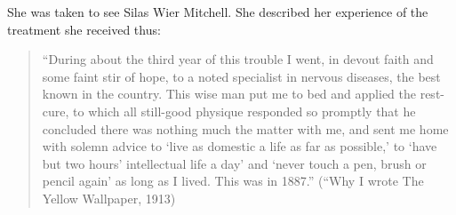 \begin{refsection}
She was taken to see Silas Wier Mitchell. She described her experience of the treatment she received thus:

\begin{quote}

“During about the third year of this trouble I went, in devout faith and some faint stir of hope, to a noted specialist in nervous diseases, the best known in the country. This wise man put me to bed and applied the rest-cure, to which all still-good physique responded so promptly that he concluded there was nothing much the matter with me, and sent me home with solemn advice to `live as domestic a life as far as possible,' to `have but two hours' intellectual life a day' and `never touch a pen, brush or pencil again' as long as I lived. This was in 1887.” (“Why I wrote The Yellow Wallpaper, 1913)
\end{quote}


\end{refsection}
